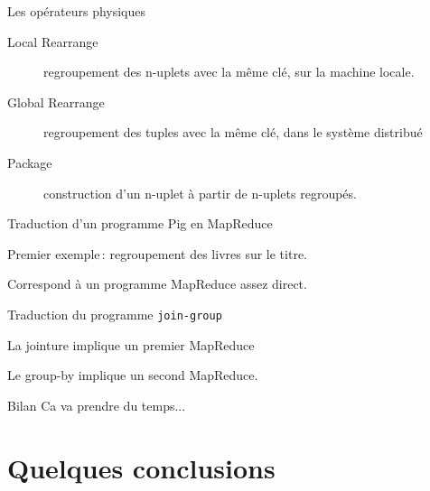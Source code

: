 \begin{frame}{Les opérateurs physiques}

\begin{description}
\item[Local Rearrange] regroupement des n-uplets avec la même clé, sur la machine locale. 

\item[Global Rearrange] regroupement des tuples avec la même clé, dans le système distribué

\item[Package] construction d'un n-uplet  à partir de n-uplets regroupés.
\end{description}

\end{frame}

\begin{frame}{Traduction d'un programme Pig en MapReduce}

Premier exemple\,: regroupement des livres sur le titre.


Correspond à un programme MapReduce assez direct.

\end{frame}


\begin{frame}{Traduction du programme \texttt{join-group}}

La jointure implique un premier MapReduce

\vfill


\vfill

Le group-by implique un second MapReduce.

\begin{block}{Bilan}
Ca va prendre du temps...
\end{block}
\end{frame}

\section{Quelques conclusions}

